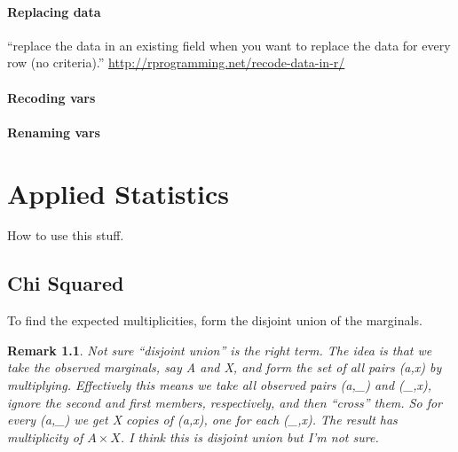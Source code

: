 \documentclass[reqno,12pt]{tufte-book}
\numberwithin{equation}{subsection}
\newtheorem{remark}{Remark}
\begin{document}
\subsection{Replacing data}
\label{subs:}

``replace the data in an existing field when you want to replace the data for every row (no criteria).'' \url{http://rprogramming.net/recode-data-in-r/}

\subsection{Recoding vars}
\label{sub:recodingvars}

\subsection{Renaming vars}
\label{sub:renamingvars}


\part{Applied Statistics}

How to use this stuff.

\chapter{Chi Squared}
\label{sect:chisquared}

To find the expected multiplicities, form the disjoint union of the marginals.

\begin{remark}
  Not sure ``disjoint union'' is the right term.  The idea is that we
  take the observed marginals, say A and X, and form the set of all
  pairs (a,x) by multiplying.  Effectively this means we take all
  observed pairs (a,\_) and (\_,x), ignore the second and first
  members, respectively, and then ``cross'' them.  So for every (a,\_)
  we get X copies of (a,x), one for each (\_,x).  The result has
  multiplicity of \(A\times X\).  I think this is disjoint union but
  I'm not sure.
\end{remark}

\end{document}
